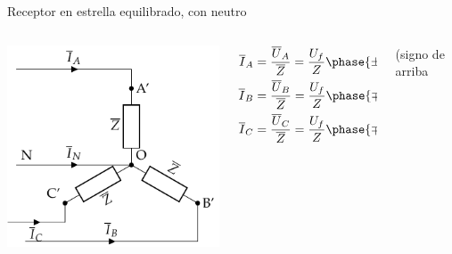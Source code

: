 \documentclass[aspectratio=169, usenames,svgnames,dvipsnames]{beamer}
\begin{document}
\begin{frame}{Receptor en estrella equilibrado, \hspace{3mm}con neutro}
    \begin{columns}
    \begin{column}{0.5\columnwidth}
        \begin{center}
            \includegraphics[width=.9\linewidth]{../figs/EstrellaEquilibrado_Receptor.pdf}
        \end{center}
    \end{column}
    
    \begin{column}{0.5\columnwidth}
        \begin{columns}
        \begin{column}{0.5\columnwidth}
            \begin{align*}
              \overline{I}_A &= \frac{\overline{U}_A}{\overline{Z}} = \frac{U_f}{Z}\phase{\ang{\pm 90} - \theta} \\
              \overline{I}_B &= \frac{\overline{U}_B}{\overline{Z}} = \frac{U_f}{Z}\phase{\ang{\mp 30} - \theta}\\
              \overline{I}_C &= \frac{\overline{U}_C}{\overline{Z}} = \frac{U_f}{Z}\phase{\ang{\mp 150} - \theta}
            \end{align*}    
        \end{column}
        \begin{column}{0.5\columnwidth}
            \begin{center}
                \footnotesize{(signo de arriba 
                
}
\end{center}
\end{column}
\end{columns}
\end{column}
\end{columns}
\end{frame}
\end{document}

